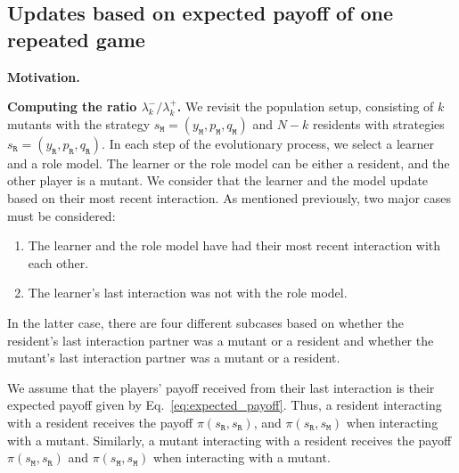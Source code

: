 \documentclass[11pt]{article}
\def\resident{\texttt{R}}
\def\mutant{\texttt{M}}
\def\strategy{s}
\theoremstyle{plainCl1}
\theoremstyle{plainCl2}
\begin{document}

\subsection{Updates based on expected payoff of one repeated game}\label{section:one_interaction_full_memory}


{\bf Motivation.}



\noindent
{\bf Computing the ratio $\lambda^-_k/\lambda^+_k$.}
We revisit the population setup, consisting of \(k\) mutants with the strategy
\(\strategy_\mutant = (y_\mutant, p_\mutant, q_\mutant)\) and \(N-k\) residents
with strategies \(\strategy_\resident = (y_\resident, p_\resident,
q_\resident)\). In each step of the evolutionary process, we select a learner and
a role model. The learner or the role model can be either a resident, and the
other player is a mutant. We consider that the learner and the
model update based on their most recent interaction. As mentioned previously,
two major cases must be considered:

\begin{enumerate}
  \item The learner and the role model have had their most recent interaction with each other.
  \item The learner's last interaction was not with the role model.
\end{enumerate}

In the latter case, there are four different subcases based on whether the
resident's last interaction partner was a mutant or a resident and whether the
mutant's last interaction partner was a mutant or a resident.

We assume that the players' payoff received from their last interaction is their
expected payoff given by Eq.~\eqref{eq:expected_payoff}. Thus, a resident
interacting with a resident receives the payoff $\pi(\strategy_\resident, \strategy_\resident)$,
and $\pi(\strategy_\resident, \strategy_\mutant)$ when interacting with a mutant. Similarly, a
mutant interacting with a resident receives the payoff $\pi(\strategy_\mutant,
\strategy_\resident)$ and $\pi(\strategy_\mutant, \strategy_\mutant)$ when interacting with a mutant.\\
\end{document}
